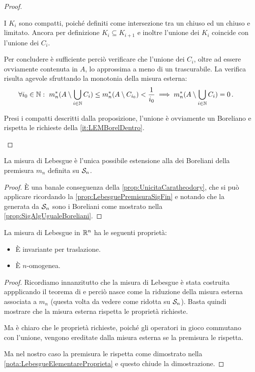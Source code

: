 \begin{proof}
\begin{description}
		I $K_i$ sono compatti, poiché definiti come intersezione tra un chiuso ed un chiuso e limitato. 
		Ancora per definizione $K_i\subseteq K_{i+1}$ e inoltre l'unione dei $K_i$ coincide con l'unione dei $C_i$.
		
		Per concludere è sufficiente perciò verificare che l'unione dei $C_i$, oltre ad essere ovviamente contenuta in $A$, lo approssima a meno di un trascurabile.
		La verifica risulta agevole sfruttando la monotonia della misura esterna:
		\begin{equation*}
			\forall i_0\in\N:\ m_n^*(A\setminus \bigcup_{i\in\N} C_i)\le m_n^*(A\setminus C_{i_0})< \frac 1{i_0}\implies m_n^*(A\setminus \bigcup_{i\in\N} C_i)=0 \punto
		\end{equation*}

		\item[\ImplicationProof{it:LEMCompattiDentro}{it:LEMBorelDentro}] Presi i compatti descritti dalla proposizione, l'unione è ovviamente un Boreliano e rispetta le richieste della \ref{it:LEMBorelDentro}.
	\end{description}

\end{proof}

\begin{proposition}\label{prop:LebesgueUnicaEstensione}
	La misura di Lebesgue è l'unica possibile estensione alla \sigalg{} dei Boreliani della premisura $m_n$ definita su $\S_n$.
\end{proposition}
\begin{proof}
	È una banale conseguenza della \cref{prop:UnicitaCaratheodory}, che si può applicare ricordando la \cref{prop:LebesguePremisuraSigFin} e notando che la \sigalg{} generata da $\S_n$ sono i Boreliani come mostrato nella \cref{prop:SigAlgUgualeBoreliani}.
\end{proof}

\begin{remark}\label{nota:LebesgueProprieta}
	La misura di Lebesgue in $\R^n$ ha le seguenti proprietà:
	\begin{itemize}
		\item È invariante per traslazione.
		\item È $n$-omogenea.
	\end{itemize}
\end{remark}
\begin{proof}
	Ricordiamo innanzitutto che la misura di Lebesgue è stata costruita appplicando il teorema di \carat{} e perciò nasce come la riduzione della misura esterna associata a $m_n$ (questa volta da vedere come ridotta su $\S_n$). 
	Basta quindi mostrare che la misura esterna rispetta le proprietà richieste.
	
	Ma è chiaro che le proprietà richieste, poiché gli operatori in gioco commutano con l'unione, vengono ereditate dalla misura esterna se la premisura le rispetta.
	
	Ma nel nostro caso la premisura le rispetta come dimostrato nella \cref{nota:LebesgueElementareProprieta} e questo chiude la dimostrazione.
\end{proof}

